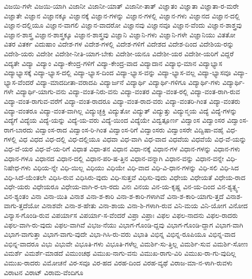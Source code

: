 {ವಿಜಯಿ-ಗಳೇ
ವಿಜಯಿ-ಯಾಗಿ
ವಿಜಾನೀ
ವಿಜಾನೀ-ಯಾತ್
ವಿಜಾನೀ-ತಾತ್
ವಿಜ್ಞಾತಂ
ವಿಜ್ಞಾತಾ
ವಿಜ್ಞಾತಾ-ರ-ಮರೇ
ವಿಜ್ಞಾತೇ
ವಿಜ್ಞಾನ
ವಿಜ್ಞಾನಕ್ಕೂ
ವಿಜ್ಞಾನಕ್ಕೆ
ವಿಜ್ಞಾನ-ಗಳನ್ನು
ವಿಜ್ಞಾನ-ಗಳಲ್ಲಿ
ವಿಜ್ಞಾನ-ಗಳು
ವಿಜ್ಞಾನದ
ವಿಜ್ಞಾನ-ದಲ್ಲಿ
ವಿಜ್ಞಾನ-ದಲ್ಲಿಯೂ
ವಿಜ್ಞಾನ-ವಾಗಲಿ
ವಿಜ್ಞಾನ-ವಾದರೋ
ವಿಜ್ಞಾನವು
ವಿಜ್ಞಾನವೂ
ವಿಜ್ಞಾನ-ವೆಂದು
ವಿಜ್ಞಾನ-ಶಾಶ್ತ್ರವು
ವಿಜ್ಞಾನ-ಶಾಸ್ತ್ರ
ವಿಜ್ಞಾನ-ಶಾಸ್ತ್ರಕ್ಕೂ
ವಿಜ್ಞಾನ-ಶಾಸ್ತ್ರವು
ವಿಜ್ಞಾನಿ
ವಿಜ್ಞಾನಿ-ಗಳು
ವಿಜ್ಞಾನಿ-ಗಳೇ
ವಿಜ್ಞಾನಿಯು
ವಿತತೋ
ವಿತರ
ವಿತರ್ಕ
ವಿದುಷಾಂ
ವಿದೇಶ-ಗಳ
ವಿದೇಶ-ಗಳಲ್ಲಿ
ವಿದೇಶ-ಗಳಿಗೆ
ವಿದೇಶದ
ವಿದೇಶ-ದಿಂದ
ವಿದೇಶಿಯ-ರನ್ನು
ವಿದೇಶಿ-ಯರು
ವಿದೇಶೀ
ವಿದೇಶೀ-ನೀತಿ-ಯಾಗ-ಬೇಕು
ವಿದೇಶೀ-ಯನೂ
ವಿದೇಶೀ-ಯರ
ವಿದೇಶೀ-ಯರಿಗೆ
ವಿದ್ದರೆ
ವಿದ್ಯತೇ
ವಿದ್ಯಾ
ವಿದ್ಯಾಂ
ವಿದ್ಯಾ-ಕೇಂದ್ರ-ಗಳಿಗೆ
ವಿದ್ಯಾ-ಕೇಂದ್ರ-ವಾದ
ವಿದ್ಯಾದಾನ
ವಿದ್ಯಾಭಿ-ಮಾನ
ವಿದ್ಯಾಭ್ಯಾಸ
ವಿದ್ಯಾಭ್ಯಾಸಕ್ಕೆ
ವಿದ್ಯಾ-ಭ್ಯಾಸ-ದಲ್ಲಿ
ವಿದ್ಯಾ-ಭ್ಯಾಸ-ದಿಂದ
ವಿದ್ಯಾ-ಭ್ಯಾಸ-ವನ್ನು
ವಿದ್ಯಾ-ಭ್ಯಾಸ-ವಲ್ಲ
ವಿದ್ಯಾ-ಭ್ಯಾಸವೂ
ವಿದ್ಯಾ-ಭ್ಯಾಸ-ವೆಂದರೆ
ವಿದ್ಯಾ-ಮಾದದೀತಾ-ವರಾದಪಿ
ವಿದ್ಯಾರ್ಜನೆ
ವಿದ್ಯಾರ್ಥಿ
ವಿದ್ಯಾರ್ಥಿ-ಗಳಿಗೂ
ವಿದ್ಯಾರ್ಥಿ-ಗಳು
ವಿದ್ಯಾರ್ಥಿ-ಗಳೇ
ವಿದ್ಯಾರ್ಥಿ-ಯಾಗು-ವನು
ವಿದ್ಯಾ-ವಂತ-ನಿರು-ವನು
ವಿದ್ಯಾ-ವಂತರ
ವಿದ್ಯಾ-ವಂತ-ರಲ್ಲಿ
ವಿದ್ಯಾ-ವಂತ-ರಾಗಿ-ರುವ
ವಿದ್ಯಾ-ವಂತ-ರಾಗುವ-ವರೆಗೆ
ವಿದ್ಯಾ-ವಂತ-ರಾದರೂ
ವಿದ್ಯಾ-ವಂತ-ರಾದ-ವರು
ವಿದ್ಯಾ-ವಂತರಿ-ಗಿಂತ
ವಿದ್ಯಾ-ವಂತರು
ವಿದ್ಯಾ-ವಂತರೂ
ವಿದ್ಯಾ-ವಂತ-ವಾಗಿಲ್ಲ
ವಿದ್ಯುಚ್ಛಕ್ತಿ
ವಿದ್ಯುತೋ
ವಿದ್ಯುತ್
ವಿದ್ಯುತ್ತು
ವಿದ್ಯುನ್ಮಯ
ವಿದ್ಯೆ
ವಿದ್ಯೆ-ಗಳನ್ನು
ವಿದ್ಯೆಗೆ
ವಿದ್ಯೆಯ
ವಿದ್ಯೆ-ಯನ್ನು
ವಿದ್ಯೆ-ಯ-ವರು
ವಿದ್ಯೆ-ಯಿಂದ
ವಿದ್ಯೆಯೇ
ವಿದ್ವತ್ಪೂರ್ಣ
ವಿದ್ವಾಂಸ
ವಿದ್ವಾಂಸರ
ವಿದ್ವಾಂಸ-ರಾಗ-ಬಾರದು
ವಿದ್ವಾಂಸ-ರಾದ
ವಿದ್ವಾಂಸ-ರಿ-ಗಿಂತ
ವಿದ್ವಾಂಸ-ರಿಗೆ
ವಿದ್ವಾಂಸರು
ವಿದ್ವಾಂಸರೇ
ವಿದ್ವಿಷಾ-ವಹೈ
ವಿಧ-ಗಳಲ್ಲಿ
ವಿಧ
ವಿಧದ
ವಿಧ-ದಲ್ಲಿ
ವಿಧ-ದಲ್ಲಿಯೂ
ವಿಧವಾ
ವಿಧ-ವಾಗಿ
ವಿಧ-ವಾದ
ವಿಧವೆಯ
ವಿಧವೆಯೆ
ವಿಧ-ವೆ-ಯನ್ನು
ವಿಧ-ವೆ-ಯರ
ವಿಧ-ವೆ-ಯ-ರಿಗೆ
ವಿಧಾತ
ವಿಧಾ-ತನ
ವಿಧಾನ
ವಿಧಾ-ನಕ್ಕೆ
ವಿಧಾನ-ಗಳ
ವಿಧಾನ-ಗಳನ್ನು
ವಿಧಾನ-ಗಳು
ವಿಧಾನ-ಗಳೂ
ವಿಧಾನದ
ವಿಧಾನ-ದಲ್ಲಿ
ವಿಧಾನ-ಪರಿ-ಷ-ತ್ತಿನ
ವಿಧಾನ-ವನ್ನಾಗಿ
ವಿಧಾನ-ವನ್ನು
ವಿಧಾನ-ವನ್ನೇ
ವಿಧಿ-ನಿಷೇಧ-ಗಳು
ವಿಧಿಯ-ನ್ನೇ
ವಿಧಿ-ಯಿಲ್ಲ
ವಿಧಿಯು
ವಿಧಿಯೇ
ವಿಧಿ-ವಾದ
ವಿಧಿ-ವಿ-ಧಾನ-ಗಳನ್ನು
ವಿಧಿ-ಸಲಿ
ವಿಧಿ-ಸಿದ
ವಿಧಿ-ಸಿದೆ-ಯೆಂತಲೇ
ವಿಧಿಸಿ-ರುವ
ವಿಧಿಸಿರು-ವುದು
ವಿಧಿ-ಸುತ್ತವೆ
ವಿಧಿಸು-ವುದು
ವಿಧೇಯ
ವಿಧೇಯತೆ
ವಿಧೇಯ-ರಾದ
ವಿಧೇ-ಯರು
ವಿಧೇಯರೂ
ವಿಧೇಯ-ವಾಗಿ-ರ-ಲಾ-ರದು
ವಿನಃ
ವಿನಯ
ವಿನ-ಯ-ಕೃಷ್ಣ
ವಿನ-ಯ-ದಿಂದ
ವಿನ-ಶ್ಯತ್ಸ್ವ-ವಿನ-ಶ್ಯಂತಂ
ವಿನಾ
ವಿನಾ-ಯಿತಿ
ವಿನಾಶ
ವಿನಾ-ಶ-ಕಾರಿ
ವಿನಾ-ಶ-ಕಾರಿ-ಗಳಾಗಿವೆ
ವಿನಾ-ಶ-ಕಾರಿ-ಯಾಗು-ತ್ತದೆ
ವಿನಾಶ-ವಾಗು-ತ್ತದೆಯೋ
ವಿನಾಶವೇ
ವಿನಾ-ಶ-ಹೇತು
ವಿನಾ-ಶಾಯ
ವಿನಾ-ಶಿ-ಗಳಾಗಿ-ರುವ
ವಿನಿ-ಮಯ
ವಿನಿ-ಯೋಗ
ವಿನೋದ
ವಿನ್ಯಾಸ-ಗೊಂಡಿ-ರುವ
ವಿಪರ್ಯಾಸ
ವಿಪರ್ಯಾ-ಸ-ವೆಂದರೆ
ವಿಪ್ರಾ
ವಿಪ್ರಾಃ
ವಿಫಲ
ವಿಫಲ-ನಾದನು
ವಿಫಲ-ರಾದರು
ವಿಫಲ-ವಾಗಿ-ರು-ವುದು
ವಿಫಲ-ವಾಗಿವೆ
ವಿಭಜ-ನೆಯು
ವಿಭಾಗ-ಗೊಂಡಿ-ದ್ದವು
ವಿಭಾಗ-ಗೊಂಡಿ-ದ್ದಾಗ
ವಿಭಾಗ-ವಾಗಿ
ವಿಭಾಗ-ವಾಗುತ್ತಾ
ವಿಭಾಗ-ವಾಗು-ವುದೇ
ವಿಭಾ-ಗಿಸಿ-ರು-ವರು
ವಿಭಾತಿ
ವಿಭಿನ್ನ
ವಿಭಿನ್ನ-ರೂಪಿಯೂ
ವಿಭಿನ್ನ-ವಾದ
ವಿಭಿನ್ನ-ವಾದರೂ
ವಿಭು
ವಿಭುವೇ
ವಿಭೂತಿ-ಗಳು
ವಿಭೂತಿ-ಗಳೆಲ್ಲ
ವಿಮರ್ಶಿ-ಸು-ತ್ತಿಲ್ಲ
ವಿಮರ್ಶಿ-ಸುವ
ವಿಮರ್ಶಿ-ಸೋಣ
ವಿಮರ್ಶೆ
ವಿಮರ್ಶೆ-ಮಾಡದೆ
ವಿಮುಂಚಥ
ವಿಮುಖ-ನಾಗು-ವನು
ವಿಮುಖ-ರಾಗು-ವಿರಿ
ವಿಮುಖ-ರಾ-ಗು-ವುದಿಲ್ಲ
ವಿಮುಖ-ರಾದರು
ವಿಮೋಚನೆ
ವಿರ-ಸವೂ
ವಿರ-ಹದ
ವಿರಹ-ದಿಂದ
ವಿರಹ-ವ್ಯಥೆ
ವಿರಾಜ-ಮಾ-ನ-ಳಾಗಿ-ರುವಳು
ವಿರಾಟನ
ವಿರಾಟ್
ವಿರಾಮ-ವೆಂದಿಗೂ
}
